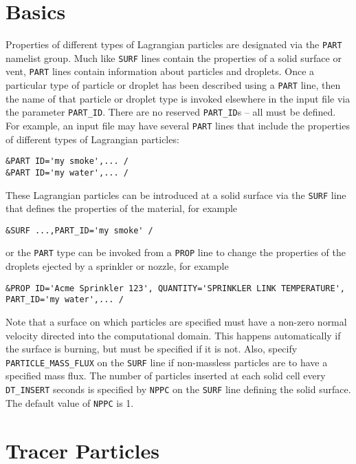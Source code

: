 \documentclass[11pt]{book}
\newcommand{\ct}{\tt\small}
\begin{document}
\section{Basics}

Properties of different types of
Lagrangian particles are designated via the {\ct PART} namelist group.
Much like {\ct SURF} lines contain the properties of a solid surface or
vent, {\ct PART} lines contain information about particles and droplets.
Once a particular type of particle or droplet has been described using
a {\ct PART} line, then the name of that particle or droplet type is invoked
elsewhere in the input file via the parameter {\ct PART\_ID}. There are no reserved {\ct PART\_ID}s -- all must be defined.
For example, an input file may have several {\ct PART} lines that include the
properties of different types of Lagrangian particles:

\footnotesize
\begin{verbatim}
&PART ID='my smoke',... /
&PART ID='my water',... /
\end{verbatim}
\normalsize
These Lagrangian particles can be introduced at a solid surface via the {\ct SURF} line
that defines the properties of the material, for example

\footnotesize
\begin{verbatim}
&SURF ...,PART_ID='my smoke' /
\end{verbatim}
\normalsize
or the {\ct PART} type can be invoked from a {\ct PROP} line to change
the properties of the droplets ejected by a sprinkler or nozzle, for example

\footnotesize
\begin{verbatim}
&PROP ID='Acme Sprinkler 123', QUANTITY='SPRINKLER LINK TEMPERATURE', PART_ID='my water',... /
\end{verbatim}
\normalsize
Note that a surface on which particles are specified must have a non-zero normal velocity directed into the
computational domain. This happens automatically if the surface is burning, but must be specified
if it is not. Also, specify {\ct PARTICLE\_MASS\_FLUX} on the {\ct SURF} line if non-massless particles
are to have a specified mass flux. The number of particles inserted at each solid cell every
{\ct DT\_INSERT} seconds is specified by {\ct NPPC} on the {\ct SURF} line defining the solid surface. The default
value of {\ct NPPC} is 1.


\section{Tracer Particles}
\end{document}
